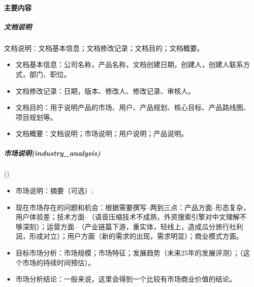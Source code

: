 \documentclass[letterpaper,11pt,english]{sphinxmanual}
\begin{document}
\paragraph{主要内容}
\label{\detokenize{chapter_knowledge/MRD:id3}}

\subparagraph{文档说明}
\label{\detokenize{chapter_knowledge/MRD:id4}}
文档说明：文档基本信息；文档修改记录；文档目的；文档概要。
\begin{itemize}
\item {} 
文档基本信息：公司名称，产品名称，文档创建日期，创建人，创建人联系方式，部门、职位。

\item {} 
文档修改记录：日期，版本、修改人、修改记录、审核人。

\item {} 
文档目的：用于说明产品的市场、用户、产品规划、核心目标、产品路线图、项目规划等。

\item {} 
文档概要：文档说明；市场说明；用户说明；产品说明。

\end{itemize}


\subparagraph{市场说明(industry\_analysis)}
\label{\detokenize{chapter_knowledge/MRD:industry-analysis}}
{\hyperref[\detokenize{chapter_knowledge/industry_analysis:industry-analysis}]{}} ()
\begin{itemize}
\item {} 
市场说明：摘要（可选）;

\item {} 
现在市场存在的问题和机会：根据需要撰写–两到三点：产品方面–形态复杂，用户体验差；技术方面–（语音压缩技术不成熟，外资搜索引擎对中文理解不够深刻）；运营方面–（产业链篇下游，重实体，轻线上，造成瓜分旅行社利润，形成对立）；用户方面（新的需求的出现，需求明显）；商业模式方面。

\item {} 
目标市场分析：市场规模；市场特征；发展趋势（未来2\sphinxhyphen{}5年的发展评测）；（这个市场的持续时间预估）。

\item {} 
市场分析结论：一般来说，这里会得到一个比较有市场商业价值的结论。

\end{itemize}
\end{document}
